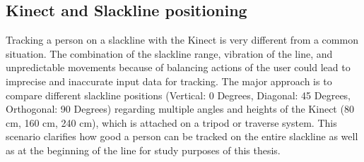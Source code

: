 \subsection{Kinect and Slackline positioning}\label{5_1_technicalFeasibility}
Tracking a person on a slackline with the Kinect is very different from a common situation.
The combination of the slackline range, vibration of the line, and unpredictable movements because of balancing actions of the user could lead to imprecise and inaccurate input data for tracking.
The major approach is to compare different slackline positions (Vertical: 0 Degrees, Diagonal: 45 Degrees, Orthogonal: 90 Degrees) regarding multiple angles and heights of the Kinect (80 cm, 160 cm, 240 cm), which is attached on a tripod or traverse system.
This scenario clarifies how good a person can be tracked on the entire slackline as well as at the beginning of the line for study purposes of this thesis.

